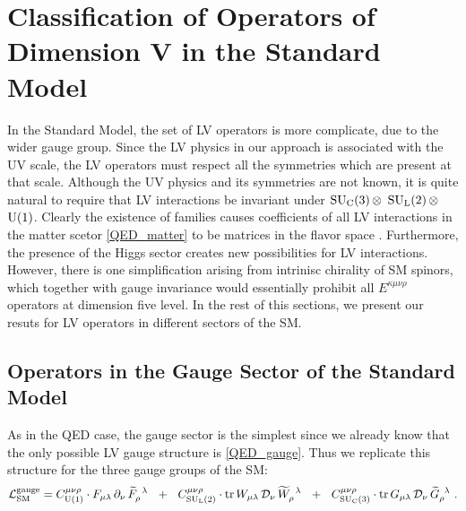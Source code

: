\documentclass[12pt,preprintnumbers,nofootinbib]{revtex4}
\newcommand{\wt}{\widetilde}
\newcommand{\suc}{{{\rm SU}_{\rm C}(3)}}
\newcommand{\sul}{{{\rm SU}_{\rm L}(2)}}
\newcommand{\ue}{{{\rm U}(1)}}
\begin{document}
\section{Classification of Operators of Dimension V in the Standard Model}

	In the Standard Model, the set of LV operators is more complicate,
	due to the wider gauge group. 
	Since the LV physics in our approach is associated with the UV scale, 
    the LV operators must 
	respect all the symmetries which are present at that scale.
	Although the UV physics and its symmetries are not known, it is quite natural 
    to require that LV interactions be invariant under 
	$ \suc\, \otimes $ $ \sul\, \otimes $ $ \ue $.
	Clearly the existence of families causes coefficients
	of all LV interactions in the matter scetor \eqref{QED_matter} to be 
	matrices in the flavor space
\cite{Colladay:1998fq}.
	Furthermore, the presence of the Higgs sector creates new
	possibilities for LV interactions. 
	However, there is one simplification arising from intrinisc chirality of
	SM spinors, which together with gauge invariance 
   would essentially prohibit all $E^{\kappa\mu\nu\rho}$ operators at dimension five level.
In the rest of this sections, we present our resuts for LV operators in different 
sectors of the SM. 

	
	
\subsection{Operators in the Gauge Sector of the Standard Model}

	As in the QED case, the gauge sector is the simplest since we already know
	that the only possible LV gauge structure is 
	\eqref{QED_gauge}.
	Thus we replicate this structure for the three gauge groups of the SM:
\begin{equation}
\label{SM_gauge}
	\mathcal{L}_{\rm SM}^{\rm gauge} = 
	C_{\ue}^{\mu\nu\rho} \cdot 
	F_{\mu\lambda} \,\partial_\nu\, \wt{F}_\rho^{\phantom{\rho}\lambda}
	~~+~~
	C_{\sul}^{\mu\nu\rho} \cdot 
	{\rm tr}\,
	W_{\mu\lambda} \,\mathcal{D}_\nu\, \wt{W}_\rho^{\phantom{\rho}\lambda}
	~~+~~
	C_{\suc}^{\mu\nu\rho} \cdot 
	{\rm tr}\,
	G_{\mu\lambda} \,\mathcal{D}_\nu\, \wt{G}_\rho^{\phantom{\rho}\lambda}
	~.
\end{equation}
\end{document}
